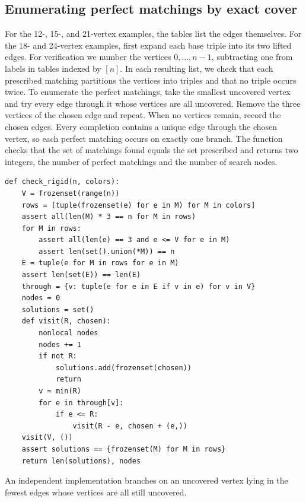 \documentclass[10pt]{article}
\numberwithin{equation}{section}
\begin{document}
\subsection{Enumerating perfect matchings by exact cover}\label{finite:subsec:exact-cover}
For the 12-, 15-, and 21-vertex examples, the tables list the edges themselves. For the 18- and 24-vertex examples, first expand each base triple into its two lifted edges. For verification we number the vertices $0,\ldots,n-1$, subtracting one from labels in tables indexed by $[n]$. In each resulting list, we check that each prescribed matching partitions the vertices into triples and that no triple occurs twice. To enumerate the perfect matchings, take the smallest uncovered vertex and try every edge through it whose vertices are all uncovered. Remove the three vertices of the chosen edge and repeat. When no vertices remain, record the chosen edges. Every completion contains a unique edge through the chosen vertex, so each perfect matching occurs on exactly one branch. The function checks that the set of matchings found equals the set prescribed and returns two integers, the number of perfect matchings and the number of search nodes.
\par\noindent\begin{minipage}{\linewidth}
\begin{verbatim}
def check_rigid(n, colors):
    V = frozenset(range(n))
    rows = [tuple(frozenset(e) for e in M) for M in colors]
    assert all(len(M) * 3 == n for M in rows)
    for M in rows:
        assert all(len(e) == 3 and e <= V for e in M)
        assert len(set().union(*M)) == n
    E = tuple(e for M in rows for e in M)
    assert len(set(E)) == len(E)
    through = {v: tuple(e for e in E if v in e) for v in V}
    nodes = 0
    solutions = set()
    def visit(R, chosen):
        nonlocal nodes
        nodes += 1
        if not R:
            solutions.add(frozenset(chosen))
            return
        v = min(R)
        for e in through[v]:
            if e <= R:
                visit(R - e, chosen + (e,))
    visit(V, ())
    assert solutions == {frozenset(M) for M in rows}
    return len(solutions), nodes
\end{verbatim}
\end{minipage}\par
An independent implementation branches on an uncovered vertex lying in the fewest edges whose vertices are all still uncovered.
\end{document}
